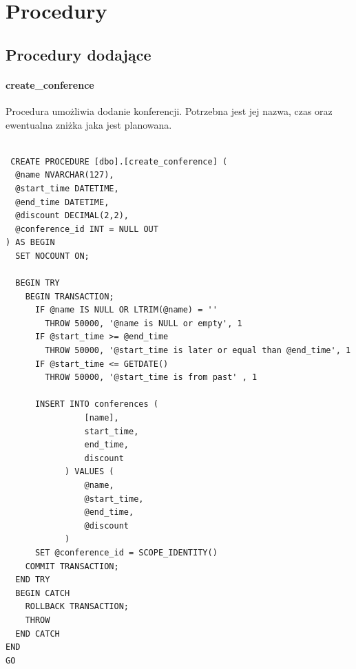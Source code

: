 \documentclass[12pt]{article}
\begin{document}
\section{Procedury}
\subsection{Procedury dodające \\}
\paragraph{create\_conference \\}
Procedura umożliwia dodanie konferencji. Potrzebna jest jej nazwa, czas oraz ewentualna zniżka jaka jest planowana. \\ \\
\begin{lstlisting}
 CREATE PROCEDURE [dbo].[create_conference] (
  @name NVARCHAR(127),
  @start_time DATETIME,
  @end_time DATETIME,
  @discount DECIMAL(2,2),
  @conference_id INT = NULL OUT
) AS BEGIN
  SET NOCOUNT ON;

  BEGIN TRY
    BEGIN TRANSACTION;
      IF @name IS NULL OR LTRIM(@name) = ''
        THROW 50000, '@name is NULL or empty', 1
	  IF @start_time >= @end_time
		THROW 50000, '@start_time is later or equal than @end_time', 1
	  IF @start_time <= GETDATE()
		THROW 50000, '@start_time is from past' , 1

      INSERT INTO conferences (
				[name],
				start_time,
				end_time,
				discount
			) VALUES (
				@name,
				@start_time,
				@end_time,
				@discount
			)
      SET @conference_id = SCOPE_IDENTITY()
    COMMIT TRANSACTION;
  END TRY
  BEGIN CATCH
    ROLLBACK TRANSACTION;
    THROW
  END CATCH
END
GO
\end{lstlisting}
\newpage
\end{document}
